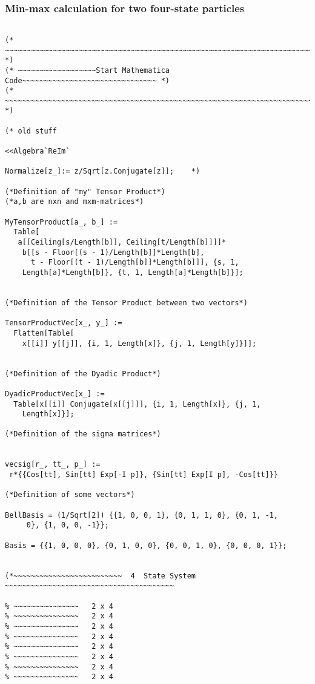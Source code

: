 \documentclass[%
  twocolumn,
 showpacs,
 showkeys,
 preprintnumbers,
 amsmath,amssymb,
 aps,
  pra,
  longbibliography,
 floatfix,
 ]{revtex4-1}
\begin{document}
\subsubsection{Min-max calculation for two four-state particles}

{ \begin{lstlisting}[backgroundcolor=\color{yellow!10},framerule=0pt,breaklines=true, frame=tb]

(* ~~~~~~~~~~~~~~~~~~~~~~~~~~~~~~~~~~~~~~~~~~~~~~~~~~~~~~~~~~~~~~~~~~~~~~~ *)
(* ~~~~~~~~~~~~~~~~~~Start Mathematica Code~~~~~~~~~~~~~~~~~~~~~~~~~~~~~~~ *)
(* ~~~~~~~~~~~~~~~~~~~~~~~~~~~~~~~~~~~~~~~~~~~~~~~~~~~~~~~~~~~~~~~~~~~~~~~ *)

(* old stuff

<<Algebra`ReIm`

Normalize[z_]:= z/Sqrt[z.Conjugate[z]];    *)

(*Definition of "my" Tensor Product*)
(*a,b are nxn and mxm-matrices*)

MyTensorProduct[a_, b_] :=
  Table[
   a[[Ceiling[s/Length[b]], Ceiling[t/Length[b]]]]*
    b[[s - Floor[(s - 1)/Length[b]]*Length[b],
      t - Floor[(t - 1)/Length[b]]*Length[b]]], {s, 1,
    Length[a]*Length[b]}, {t, 1, Length[a]*Length[b]}];


(*Definition of the Tensor Product between two vectors*)

TensorProductVec[x_, y_] :=
  Flatten[Table[
    x[[i]] y[[j]], {i, 1, Length[x]}, {j, 1, Length[y]}]];


(*Definition of the Dyadic Product*)

DyadicProductVec[x_] :=
  Table[x[[i]] Conjugate[x[[j]]], {i, 1, Length[x]}, {j, 1,
    Length[x]}];

(*Definition of the sigma matrices*)


vecsig[r_, tt_, p_] :=
 r*{{Cos[tt], Sin[tt] Exp[-I p]}, {Sin[tt] Exp[I p], -Cos[tt]}}

(*Definition of some vectors*)

BellBasis = (1/Sqrt[2]) {{1, 0, 0, 1}, {0, 1, 1, 0}, {0, 1, -1,
     0}, {1, 0, 0, -1}};

Basis = {{1, 0, 0, 0}, {0, 1, 0, 0}, {0, 0, 1, 0}, {0, 0, 0, 1}};


(*~~~~~~~~~~~~~~~~~~~~~~~~~  4  State System ~~~~~~~~~~~~~~~~~~~~~~~~~~~~~~~~~~~~~~~

% ~~~~~~~~~~~~~~~   2 x 4
% ~~~~~~~~~~~~~~~   2 x 4
% ~~~~~~~~~~~~~~~   2 x 4
% ~~~~~~~~~~~~~~~   2 x 4
% ~~~~~~~~~~~~~~~   2 x 4
% ~~~~~~~~~~~~~~~   2 x 4
% ~~~~~~~~~~~~~~~   2 x 4
% ~~~~~~~~~~~~~~~   2 x 4


\end{lstlisting}}
\end{document}
